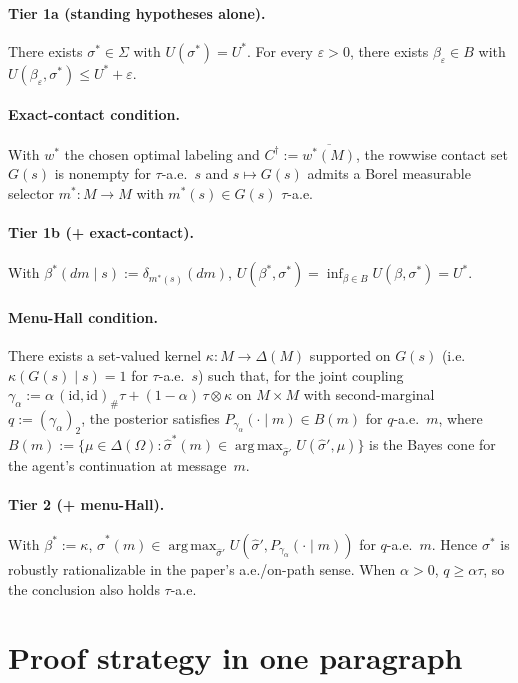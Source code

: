 \documentclass[11pt]{article}
\theoremstyle{definition}
\theoremstyle{remark}
\newcommand{\eps}{\varepsilon}
\newcommand{\Om}{\Omega}
\newcommand{\Si}{\Sigma}
\newcommand{\argmax}{\operatorname*{arg\,max}}
\begin{document}
\paragraph{Tier 1a (standing hypotheses alone).}
There exists $\sigma^*\in\Si$ with $U(\sigma^*) = U^*$. For every
$\eps>0$, there exists $\beta_\eps\in B$ with
$U(\beta_\eps,\sigma^*) \le U^* + \eps$.

\paragraph{Exact-contact condition.}
With $w^*$ the chosen optimal labeling and $C^\dagger := \overline{w^*(M)}$,
the rowwise contact set $G(s)$ is nonempty for $\tau$-a.e.~$s$ and
$s\mapsto G(s)$ admits a Borel measurable selector
$m^*:M\to M$ with $m^*(s)\in G(s)$ $\tau$-a.e.

\paragraph{Tier 1b (+ exact-contact).}
With $\beta^*(dm\mid s) := \delta_{m^*(s)}(dm)$,
$U(\beta^*,\sigma^*) = \inf_{\beta\in B} U(\beta,\sigma^*) = U^*$.

\paragraph{Menu-Hall condition.}
There exists a set-valued kernel $\kappa:M\to\Delta(M)$ supported
on $G(s)$ (i.e.\ $\kappa(G(s)\mid s) = 1$ for $\tau$-a.e.~$s$) such
that, for the joint coupling
$\gamma_\alpha := \alpha\,(\mathrm{id},\mathrm{id})_\#\tau + (1-\alpha)\,\tau\otimes\kappa$
on $M\times M$ with second-marginal $q := (\gamma_\alpha)_2$, the
posterior satisfies $P_{\gamma_\alpha}(\cdot\mid m)\in B(m)$ for
$q$-a.e.~$m$, where
$B(m) := \{\mu\in\Delta(\Om) : \hat\sigma^*(m)\in\argmax_{\hat\sigma'} U(\hat\sigma',\mu)\}$
is the Bayes cone for the agent's continuation at message~$m$.

\paragraph{Tier 2 (+ menu-Hall).}
With $\beta^* := \kappa$,
$\hat\sigma^*(m)\in\argmax_{\hat\sigma'}U(\hat\sigma',P_{\gamma_\alpha}(\cdot\mid m))$
for $q$-a.e.~$m$. Hence $\sigma^*$ is robustly rationalizable in
the paper's a.e./on-path sense. When $\alpha>0$, $q\ge\alpha\tau$,
so the conclusion also holds $\tau$-a.e.

\section{Proof strategy in one paragraph}\label{sec:strategy}
\end{document}
